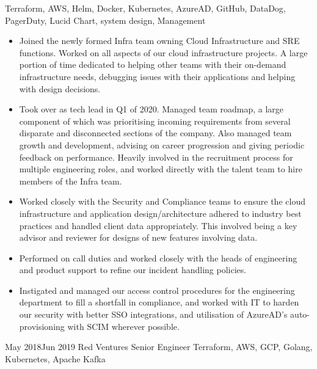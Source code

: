 \documentclass[10pt]{article} %
\begin{document}
{
      Terraform,
      AWS,
      Helm,
      Docker,
      Kubernetes,
      AzureAD,
      GitHub,
      DataDog,
      PagerDuty,
      Lucid Chart,
      system design,
      Management
}
{
  \begin{itemize}

  \item Joined the newly formed Infra team owning Cloud Infrastructure and SRE functions.
        Worked on all aspects of our cloud infrastructure projects.
        A large portion of time dedicated to helping other teams with their on-demand infrastructure needs,
        debugging issues with their applications and helping with design decisions.

  \item Took over as tech lead in Q1 of 2020. Managed team roadmap, a large component
        of which was prioritising incoming requirements from several disparate and disconnected
        sections of the company. Also managed team growth and development, advising on career
        progression and giving periodic feedback on performance. Heavily involved in
        the recruitment process for multiple engineering roles, and worked directly with the talent
        team to hire members of the Infra team.

  \item Worked closely with the Security and Compliance teams to ensure
        the cloud infrastructure and application design/architecture adhered to industry
        best practices and handled client data appropriately. This involved being a key
        advisor and reviewer for designs of new features involving data.

  \item Performed on call duties and worked closely with the heads of engineering and product support
        to refine our incident handling policies.

  \item Instigated and managed our access control procedures for the engineering department
        to fill a shortfall in compliance, and worked with IT to harden our security
        with better SSO integrations, and utilisation of AzureAD's auto-provisioning
        with SCIM wherever possible.

  \end{itemize}
}
\jobheader
{May 2018}{Jun 2019}
{Red Ventures}
{Senior Engineer}
{ 
      Terraform,
      AWS,
      GCP,
      Golang,
      Kubernetes,
      Apache Kafka
}
\end{document}
